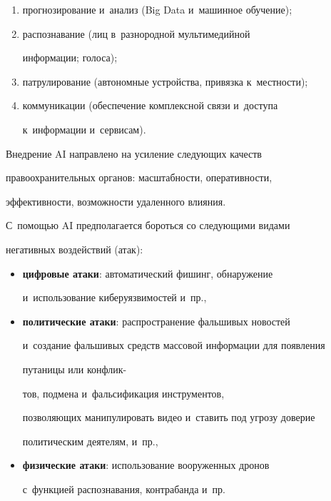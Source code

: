   \begin{enumerate}[(1)]


\item прогнозирование и~анализ (Big Data и~машинное обучение);


\item распознавание (лиц в~разнородной мультимедийной


информации; голоса);


\item патрулирование (автономные устройства, привязка к~мест\-ности);


\item коммуникации (обеспечение комплексной связи и~доступа


к~информации и~сервисам).


  \end{enumerate}





  Внедрение AI направлено на усиление следующих качеств


правоохранительных органов: масштабности, оперативности,


эффективности, возможности удаленного влияния.





  С~помощью AI предполагается бороться со следующими видами


негативных воздействий (атак):


  \begin{itemize}


\item \textbf{цифровые атаки}: автоматический фишинг, обнаружение


и~использование киберуязвимостей и~пр.,


\item \textbf{политические атаки}: распространение фальшивых новостей


и~создание фальшивых средств массовой информации для появления


путаницы или конфлик-\linebreak


\vspace*{-12pt}





\pagebreak





\noindent


тов, подмена и~фальсификация инструментов,


поз\-во\-ля\-ющих манипулировать видео и~ставить под угрозу доверие


политическим деятелям, и~пр.,








\item \textbf{физические атаки}: использование вооруженных дронов


с~функцией распознавания, контрабанда и~пр.


  \end{itemize}


